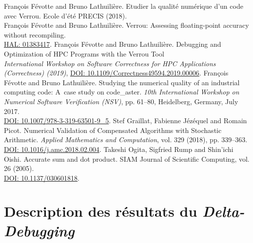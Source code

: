\documentclass[a4paper]{article}
\begin{document}
\begin{thebibliography}{9}

 François Févotte and Bruno Lathuilière. Etudier la
  qualité numérique d'un code avec Verrou. Ecole d'été PRECIS (2018).\\

 François Févotte and Bruno Lathuilière. Verrou: Assessing
  floating-point accuracy without recompiling.\\
  {\footnotesize \href{https://hal.archives-ouvertes.fr/hal-01383417}{
      HAL: 01383417}.}
 François Févotte and Bruno Lathuilière. Debugging and Optimization of {HPC} Programs with the {Verrou} Tool \\
  {\it International Workshop on Software Correctness for HPC Applications (Correctness) (2019)},
  {\footnotesize\href{https://doi.org/10.1109/Correctness49594.2019.00006}{DOI: 10.1109/Correctness49594.2019.00006}.}
 François Févotte and Bruno Lathuilière. Studying the
  numerical quality of an industrial computing code: A~case study on
  code\_aster. {\it 10th International Workshop on Numerical Software
    Verification (NSV)}, pp. 61--80, Heidelberg, Germany, July 2017.\\
  {\footnotesize \href{http://doi.org/10.1007/978-3-319-63501-9_5}{
      DOI: 10.1007/978-3-319-63501-9\_5}.}
 Stef Graillat, Fabienne Jézéquel and Romain Picot.
  Numerical Validation of Compensated Algorithms with Stochastic Arithmetic.
  {\it Applied Mathematics and Computation}, vol. 329 (2018), pp. 339--363.\\
  {\footnotesize\href{https://doi.org/10.1016/j.amc.2018.02.004}{
      DOI: 10.1016/j.amc.2018.02.004}.}
 Takeshi Ogita, Sigfried Rump and Shin'ichi Oishi. Accurate
  sum and dot product. SIAM Journal of Scientific Computing, vol. 26 (2005).\\
  {\footnotesize\href{https://doi.org/10.1137/030601818}{
      DOI: 10.1137/030601818}.}
\end{thebibliography}

\newpage\appendix

\section{Description des résultats du \textit{Delta-Debugging}}
\label{app:dd}
\end{document}
